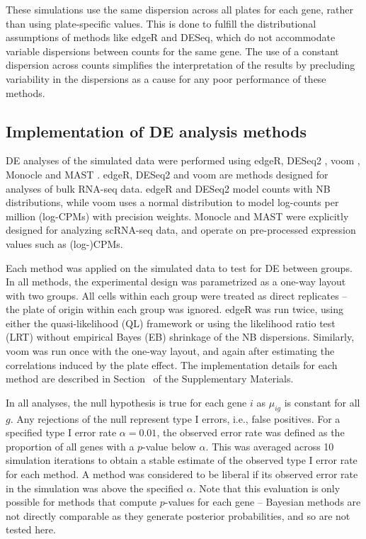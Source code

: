 \documentclass[oupdraft]{bio}
\begin{document}
These simulations use the same dispersion across all plates for each gene, rather than using plate-specific values.
This is done to fulfill the distributional assumptions of methods like edgeR and DESeq, which do not accommodate variable dispersions between counts for the same gene.
The use of a constant dispersion across counts simplifies the interpretation of the results by precluding variability in the dispersions as a cause for any poor performance of these methods.

\subsection{Implementation of DE analysis methods}
DE analyses of the simulated data were performed using edgeR, DESeq2 \citep{love2014moderated}, voom \citep{law2014voom}, Monocle and MAST \citep{finak2015mast}.
edgeR, DESeq2 and voom are methods designed for analyses of bulk RNA-seq data.
edgeR and DESeq2 model counts with NB distributions, while voom uses a normal distribution to model log-counts per million (log-CPMs) with precision weights.
Monocle and MAST were explicitly designed for analyzing scRNA-seq data, and operate on pre-processed expression values such as (log-)CPMs.

Each method was applied on the simulated data to test for DE between groups. 
In all methods, the experimental design was parametrized as a one-way layout with two groups.
All cells within each group were treated as direct replicates -- the plate of origin within each group was ignored.
edgeR was run twice, using either the quasi-likelihood (QL) framework \citep{lund2012detecting} 
    or using the likelihood ratio test (LRT) \citep{mccarthy2012differential} without empirical Bayes (EB) shrinkage of the NB dispersions.
Similarly, voom was run once with the one-way layout, and again after estimating the correlations induced by the plate effect.
The implementation details for each method are described in Section~\suppimplementation{} of the Supplementary Materials.

In all analyses, the null hypothesis is true for each gene $i$ as $\mu_{ig}$ is constant for all $g$.
Any rejections of the null represent type I errors, i.e., false positives.
For a specified type I error rate $\alpha = 0.01$, the observed error rate was defined as the proportion of all genes with a $p$-value below $\alpha$.
This was averaged across 10 simulation iterations to obtain a stable estimate of the observed type I error rate for each method. 
A method was considered to be liberal if its observed error rate in the simulation was above the specified $\alpha$.
Note that this evaluation is only possible for methods that compute $p$-values for each gene -- 
    Bayesian methods \citep{kharchenko2014bayesian} are not directly comparable as they generate posterior probabilities, and so are not tested here.
\end{document}
